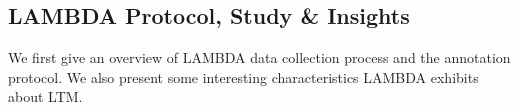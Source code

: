 









\subsection{LAMBDA Protocol, Study \& Insights}
\label{sec:Long-Term Advertisement Memorability Dataset}
We first give an overview of LAMBDA data collection process and the annotation protocol. We also present some interesting characteristics LAMBDA exhibits about LTM.

